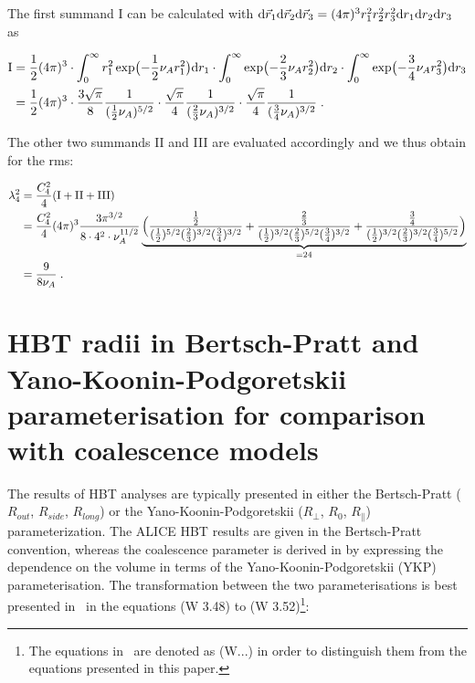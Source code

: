 \documentclass[a4paper,11pt]{scrartcl} %
\begin{document}
\begin{appendix}
\noindent The first summand I can be calculated with ${\rm d}\vec{r}_{1}{\rm d}\vec{r}_{2}{\rm d}\vec{r}_{3} = (4\pi)^3 r_1^2 r_2^2 r_3^2 {\rm d}r_{1}{\rm d}r_{2}{\rm d}r_{3}$ as

\begin{align}
 {\rm I} &= {1\over 2} (4\pi)^3 \cdot \int_{0}^{\infty} r_{1}^2 \exp\bigl(-{1\over2} \nu_A r_{1}^{2}\bigr){\rm d}r_{1} \cdot \int_{0}^{\infty}\exp\bigl(-{2\over3} \nu_A r_{2}^{2}\bigr) {\rm d}r_{2} \cdot \int_{0}^{\infty} \exp\bigl(-{3\over4} \nu_A r_{3}^{2}\bigr) {\rm d}r_{3} \\
 	&= {1\over 2} (4\pi)^3 \cdot {3\sqrt{\pi} \over 8} {1 \over ({1\over 2} \nu_{A})^{5/2}} \cdot {\sqrt{\pi} \over 4} {1 \over ({2\over 3} \nu_{A})^{3/2}} \cdot {\sqrt{\pi} \over 4} {1 \over ({3\over 4} \nu_{A})^{3/2}} \;.
\end{align}

\noindent The other two summands II and III are evaluated accordingly and we thus obtain for the rms:

\begin{align}
	\lambda_{4}^{2} &= {C_4^2 \over 4} ({\rm I} + {\rm II} + {\rm III} ) \\
	&= {C_4^2 \over 4} (4\pi)^3 {3\pi^{3/2} \over 8 \cdot 4^2 \cdot \nu_A^{11/2}} \underbrace{\Bigl({{1\over2} \over ({1\over2})^{5/2}({2\over3})^{3/2}({3\over4})^{3/2} } +
	{{2\over3} \over ({1\over2})^{3/2}({2\over3})^{5/2}({3\over4})^{3/2} } + {{3\over4} \over ({1\over2})^{3/2}({2\over3})^{3/2}({3\over4})^{5/2} } \Bigr)}_{= 24} \\
	&= {9 \over 8 \nu_A} \;.
\end{align}

%
%
\section{HBT radii in Bertsch-Pratt and Yano-Koonin-Podgoretskii parameterisation for comparison with coalescence models}\label{appendix:YKP}

The results of HBT analyses are typically presented in either the Bertsch-Pratt ($R_{out}$, $R_{side}$, $R_{long}$) or the Yano-Koonin-Podgoretskii ($R_{\perp}$, $R_{0}$, $R_{\parallel}$) parameterization. The ALICE HBT results \cite{Aamodt:2011mr, Adam:2015vna} are given in the Bertsch-Pratt convention, whereas the coalescence parameter is derived in \cite{Scheibl:1998tk} by expressing the dependence on the volume in terms of the Yano-Koonin-Podgoretskii (YKP) parameterisation. 
The transformation between the two parameterisations is best presented in~\cite{Wiedemann:1999qn} in the equations (W 3.48) to (W 3.52)\footnote{The equations in~\cite{Wiedemann:1999qn} are denoted as (W...) in order to distinguish them from the equations presented in this paper.}:


\end{appendix}
\end{document}
